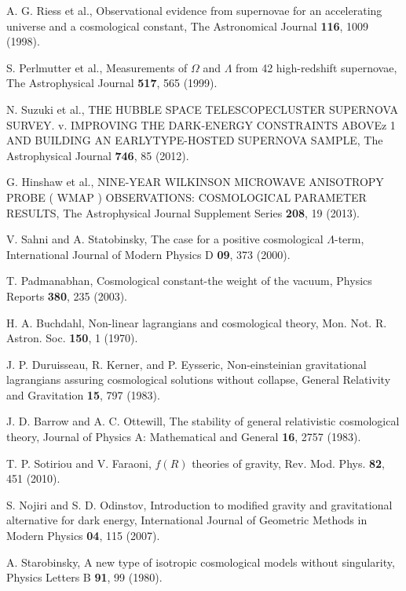 \begin{thebibliography}{87}%
A. G. Riess et al., 
Observational evidence from supernovae for an accelerating universe and a cosmological constant, 
The Astronomical Journal \textbf{116}, 1009 (1998).

S. Perlmutter et al.,
Measurements of $\Omega$ and $\Lambda$ from 42 high-redshift supernovae, 
 The Astrophysical Journal \textbf{517}, 565 (1999).
 
  N. Suzuki et al., THE HUBBLE SPACE TELESCOPECLUSTER SUPERNOVA SURVEY. v. IMPROVING THE DARK-ENERGY CONSTRAINTS ABOVEz 1 AND BUILDING AN EARLYTYPE-HOSTED SUPERNOVA SAMPLE,
 The Astrophysical Journal \textbf{746}, 85 (2012).
 
 G. Hinshaw et al., NINE-YEAR WILKINSON MICROWAVE ANISOTROPY PROBE ( WMAP ) OBSERVATIONS: COSMOLOGICAL
PARAMETER RESULTS, The Astrophysical Journal Supplement Series \textbf{208}, 19 (2013).

V. Sahni and A. Statobinsky, The case for a positive cosmological $\Lambda$-term, International Journal of Modern Physics D \textbf{09},
373 (2000).

 T. Padmanabhan, Cosmological constant-the weight of the vacuum, Physics Reports \textbf{380}, 235 (2003).

 H. A. Buchdahl, Non-linear lagrangians and cosmological theory, Mon. Not. R. Astron. Soc. \textbf{150}, 1 (1970).

 J. P. Duruisseau, R. Kerner, and P. Eysseric, Non-einsteinian gravitational lagrangians assuring cosmological solutions without
collapse, General Relativity and Gravitation \textbf{15}, 797 (1983).

 J. D. Barrow and A. C. Ottewill, The stability of general relativistic cosmological theory, Journal of Physics A: Mathematical
and General \textbf{16}, 2757 (1983).

 T. P. Sotiriou and V. Faraoni, $f(R)$ theories of gravity, Rev. Mod. Phys. \textbf{82}, 451 (2010).

S. Nojiri and S. D. Odinstov, Introduction to modified gravity and gravitational alternative for dark energy, International
Journal of Geometric Methods in Modern Physics \textbf{04}, 115 (2007).

 A. Starobinsky, A new type of isotropic cosmological models without singularity, Physics Letters B \textbf{91}, 99 (1980).


\end{thebibliography}
